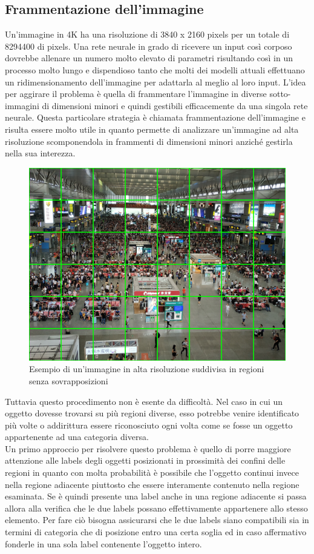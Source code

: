 \subsection{Frammentazione dell'immagine}
Un'immagine in 4K ha una risoluzione di 3840 x 2160 pixels per un totale di 8294400 di pixels. Una rete neurale in grado di ricevere un input così corposo dovrebbe allenare un numero molto elevato di parametri risultando così in un processo molto lungo e dispendioso tanto che molti dei modelli attuali effettuano un ridimensionamento dell'immagine per adattarla al meglio al loro input. L'idea per aggirare il problema è quella di frammentare l'immagine in diverse sotto-immagini di dimensioni minori e quindi gestibili efficacemente da una singola rete neurale. Questa particolare strategia è chiamata frammentazione dell'immagine e risulta essere molto utile in quanto permette di analizzare un'immagine ad alta risoluzione scomponendola in frammenti di dimensioni minori anziché gestirla nella sua interezza.
\begin{figure}[H]
	\centering
	\includegraphics[width=0.5\linewidth]{images/esempio-frammentazione.jpg}
	\caption{Esempio di un'immagine in alta risoluzione suddivisa in regioni senza sovrapposizioni}
	\label{Esempio di un'immagine in alta risoluzione frammentata in regioni senza sovrapposizioni}
\end{figure}
Tuttavia questo procedimento non è esente da difficoltà.  Nel caso in cui un oggetto dovesse trovarsi su più regioni diverse, esso potrebbe venire identificato più volte o addirittura essere riconosciuto ogni volta come se fosse un oggetto appartenente ad una categoria diversa.\\
Un primo approccio per risolvere questo problema è quello di porre maggiore attenzione alle labels degli oggetti posizionati in prossimità dei confini delle regioni in quanto con molta probabilità è possibile che l'oggetto continui invece nella regione adiacente piuttosto che essere interamente contenuto nella regione esaminata. Se è quindi presente una label anche in una regione adiacente si passa allora alla verifica che le due labels possano effettivamente appartenere allo stesso elemento. Per fare ciò bisogna assicurarsi che le due labels siano compatibili sia in termini di categoria che di posizione entro una certa soglia ed in caso affermativo fonderle in una sola label contenente l'oggetto intero.\\
